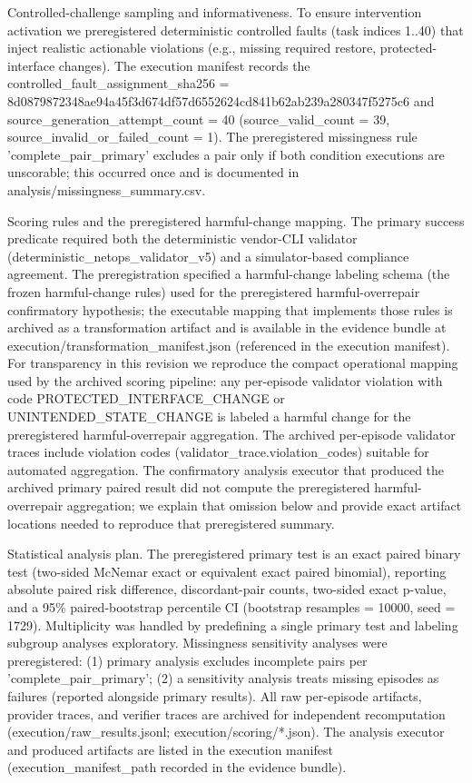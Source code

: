 \documentclass[conference]{IEEEtran}
\begin{document}
Controlled-challenge sampling and informativeness. To ensure intervention activation we preregistered deterministic controlled faults (task indices 1..40) that inject realistic actionable violations (e.g., missing required restore, protected-interface changes). The execution manifest records the controlled\_fault\_assignment\_sha256 = 8d087987\allowbreak{}2348ae94\allowbreak{}a45f3d67\allowbreak{}4df57d65\allowbreak{}52624cd8\allowbreak{}41b62ab2\allowbreak{}39a28034\allowbreak{}7f5275c6 and source\_generation\_attempt\_count = 40 (source\_valid\_count = 39, source\_invalid\_or\_failed\_count = 1). The preregistered missingness rule 'complete\_pair\_primary' excludes a pair only if both condition executions are unscorable; this occurred once and is documented in analysis/missingness\_summary.csv.

Scoring rules and the preregistered harmful-change mapping. The primary success predicate required both the deterministic vendor-CLI validator (deterministic\_netops\_validator\_v5) and a simulator-based compliance agreement. The preregistration specified a harmful-change labeling schema (the frozen harmful-change rules) used for the preregistered harmful-overrepair confirmatory hypothesis; the executable mapping that implements those rules is archived as a transformation artifact and is available in the evidence bundle at execution/transformation\_manifest.json (referenced in the execution manifest). For transparency in this revision we reproduce the compact operational mapping used by the archived scoring pipeline: any per-episode validator violation with code PROTECTED\_INTERFACE\_CHANGE or UNINTENDED\_STATE\_CHANGE is labeled a harmful change for the preregistered harmful-overrepair aggregation. The archived per-episode validator traces include violation codes (validator\_trace.violation\_codes) suitable for automated aggregation. The confirmatory analysis executor that produced the archived primary paired result did not compute the preregistered harmful-overrepair aggregation; we explain that omission below and provide exact artifact locations needed to reproduce that preregistered summary.

Statistical analysis plan. The preregistered primary test is an exact paired binary test (two-sided McNemar exact or equivalent exact paired binomial), reporting absolute paired risk difference, discordant-pair counts, two-sided exact p-value, and a 95\% paired-bootstrap percentile CI (bootstrap resamples = 10000, seed = 1729). Multiplicity was handled by predefining a single primary test and labeling subgroup analyses exploratory. Missingness sensitivity analyses were preregistered: (1) primary analysis excludes incomplete pairs per 'complete\_pair\_primary'; (2) a sensitivity analysis treats missing episodes as failures (reported alongside primary results). All raw per-episode artifacts, provider traces, and verifier traces are archived for independent recomputation (execution/raw\_results.jsonl; execution/scoring/*.json). The analysis executor and produced artifacts are listed in the execution manifest (execution\_manifest\_path recorded in the evidence bundle).
\end{document}
